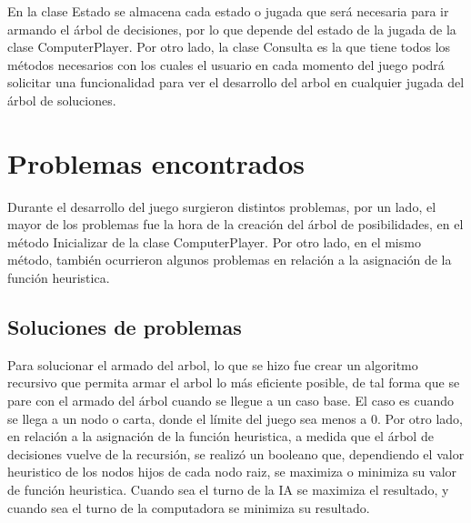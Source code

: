 \documentclass[12pt,a4paper]{article}
\begin{document}
En la clase Estado se almacena cada estado o jugada que será necesaria para ir armando el árbol de decisiones, por lo que depende del estado de la jugada de la clase ComputerPlayer.
Por otro lado, la clase Consulta es la que tiene todos los métodos necesarios con los cuales el usuario en cada momento del juego podrá solicitar una funcionalidad para ver el desarrollo del arbol en cualquier jugada del árbol de soluciones.
\newpage
\section{Problemas encontrados}
Durante el desarrollo del juego surgieron distintos problemas, por un lado, el mayor de los problemas fue la hora de la creación del árbol de posibilidades, en el método Inicializar de la clase ComputerPlayer. Por otro lado, en el mismo método, también ocurrieron algunos problemas en relación a la asignación de la función heuristica. 

\subsection{Soluciones de problemas}
Para solucionar el armado del arbol, lo que se hizo fue crear un algoritmo recursivo que permita armar el arbol lo más eficiente posible, de tal forma que se pare con el armado del árbol cuando se llegue a un caso base. El caso es cuando se llega a un nodo o carta, donde el límite del juego sea menos a 0.
Por otro lado, en relación a la asignación de la función heuristica, a medida que el árbol de decisiones vuelve de la recursión, se realizó un booleano que, dependiendo el valor heuristico de los nodos hijos de cada nodo raiz, se maximiza o minimiza su valor de función heuristica. Cuando sea el turno de la IA se maximiza el resultado, y cuando sea el turno de la computadora se minimiza su resultado.
\end{document}
